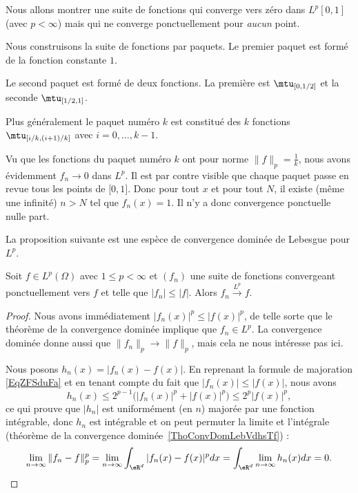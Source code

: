 \begin{example} \label{ExPOmxICc}
	Nous allons montrer une suite de fonctions qui converge vers zéro dans \( L^p[0,1]\) (avec \( p<\infty\)) mais qui ne converge ponctuellement pour \emph{aucun} point.

	Nous construisons la suite de fonctions par paquets. Le premier paquet est formé de la fonction constante \( 1\).

	Le second paquet est formé de deux fonctions. La première est \( \mtu_{\mathopen[0 , 1/2 \mathclose]}\) et la seconde \( \mtu_{\mathopen[ 1/2 , 1 \mathclose]}\).

	Plus généralement le paquet numéro \( k\) est constitué des \( k\) fonctions \( \mtu_{\mathopen[ i/k , (i+1)/k \mathclose]}\) avec \( i=0,\ldots, k-1\).

	Vu que les fonctions du paquet numéro \( k\) ont pour norme \( \| f \|_p=\frac{1}{ k }\), nous avons évidemment \( f_n\to 0\) dans \( L^p\). Il est par contre visible que chaque paquet passe en revue tous les points de \( \mathopen[ 0 , 1 \mathclose]\). Donc pour tout \( x\) et pour tout \( N\), il existe (même une infinité) \( n>N\) tel que \( f_n(x)=1\). Il n'y a donc convergence ponctuelle nulle part.
\end{example}

La proposition suivante est une espèce de convergence dominée de Lebesgue pour \( L^p\).
\begin{proposition} \label{PropBVHXycL}
	Soit \( f\in L^p(\Omega)\) avec \( 1\leq p<\infty\) et \( (f_n)\) une suite de fonctions convergeant ponctuellement vers \( f\) et telle que \( | f_n |\leq | f |\). Alors \( f_n\stackrel{L^p}{\longrightarrow}f\).
\end{proposition}

\begin{proof}
	Nous avons immédiatement \( | f_n(x) |^p\leq | f(x) |^p\), de telle sorte que le théorème de la convergence dominée implique que \( f_n\in L^p\). La convergence dominée donne aussi que \( \| f_n \|_p\to\| f \|_p\), mais cela ne nous intéresse pas ici.

	Nous posons \( h_n(x)= | f_n(x)-f(x) | \). En reprenant la formule de majoration \eqref{EqZFSduFa} et en tenant compte du fait que \( | f_n(x) |\leq | f(x) |\), nous avons
	\begin{equation}
		h_n(x)\leq 2^{p-1}\big( | f_n(x) |^p+| f(x) |^p \big)\leq 2^p| f(x) |^p,
	\end{equation}
	ce qui prouve que \( | h_n |\) est uniformément (en \( n\)) majorée par une fonction intégrable, donc \( h_n\) est intégrable et on peut permuter la limite et l'intégrale (théorème de la convergence dominée~\ref{ThoConvDomLebVdhsTf}) :
	\begin{equation}
		\lim_{n\to \infty} \| f_n-f \|^p_p=\lim_{n\to \infty} \int_{\eR^d}| f_n(x)-f(x) |^pdx=\int_{\eR^d}\lim_{n\to \infty} h_n(x)dx=0.
	\end{equation}
\end{proof}

